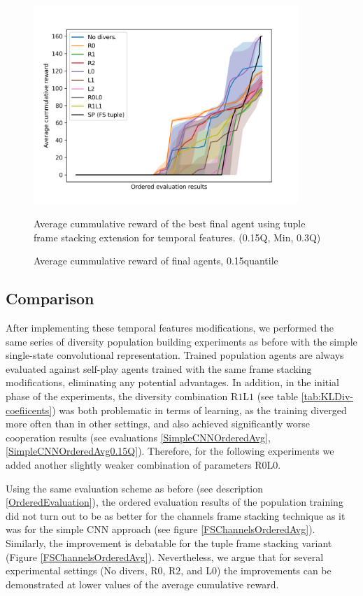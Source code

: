 \begin{figure}[!ht]
    \centering
    \includegraphics*[width=10cm]{../img/FSTupleOrderedQ15.png}

    \caption{Average cummulative reward of final agents, 0.15quantile}
    \label{FSTupleOrderedQ15}
    \medskip
    \small 
    Average cummulative reward of the best final agent using tuple frame stacking extension for temporal features.    
    (0.15Q, Min, 0.3Q)

\end{figure}

\subsection{Comparison}
After implementing these temporal features modifications, we performed the same series of diversity population building experiments as before with the simple single-state convolutional representation.
Trained population agents are always evaluated against self-play agents trained with the same frame stacking modifications, eliminating any potential advantages.
In addition, in the initial phase of the experiments, the diversity combination R$1$L$1$ (see table \ref{tab:KLDiv-coefiicents}) was both problematic in terms of learning, as the training diverged more often than in other settings, and also achieved significantly worse cooperation results (see evaluations \ref{SimpleCNNOrderedAvg}, \ref{SimpleCNNOrderedAvg0.15Q}).
Therefore, for the following experiments we added another slightly weaker combination of parameters R$0$L$0$.

Using the same evaluation scheme as before (see description \ref{OrderedEvaluation}), the ordered evaluation results of the population training did not turn out to be as better for the channels frame stacking technique as it was for the simple CNN approach (see figure \ref{FSChannelsOrderedAvg}).
Similarly, the improvement is debatable for the tuple frame stacking variant (Figure \ref{FSChannelsOrderedAvg}).
Nevertheless, we argue that for several experimental settings (No divers, R$0$, R$2$, and L$0$) the improvements can be demonstrated at lower values of the average cumulative reward.

